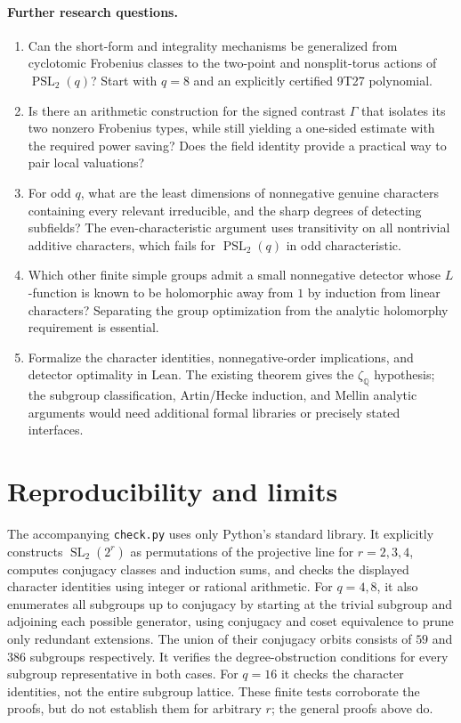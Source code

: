 \documentclass[11pt]{article}
\theoremstyle{remark}\newtheorem{remark}[theorem]{Remark}
\DeclareMathOperator{\PSL}{PSL}\DeclareMathOperator{\SL}{SL}\DeclareMathOperator{\PGL}{PGL}\DeclareMathOperator{\Ind}{Ind}\DeclareMathOperator{\ord}{ord}\DeclareMathOperator{\Gal}{Gal}\DeclareMathOperator{\Tr}{Tr}\DeclareMathOperator{\Rea}{Re}\DeclareMathOperator{\FP}{FP}
\newcommand{\Q}{\mathbb Q}\newcommand{\C}{\mathbb C}\newcommand{\F}{\mathbb F}\newcommand{\one}{\mathbf 1}\newcommand{\St}{\mathrm{St}}\newcommand{\Gg}{\Gamma}\newcommand{\PT}{\mathcal P}\newcommand{\eps}{\varepsilon}
\begin{document}
\paragraph{Further research questions.}
\begin{enumerate}
\item Can the short-form and integrality mechanisms be generalized from cyclotomic Frobenius classes to the two-point and nonsplit-torus actions of $\PSL_2(q)$? Start with $q=8$ and an explicitly certified 9T27 polynomial.
\item Is there an arithmetic construction for the signed contrast $\Gg$ that isolates its two nonzero Frobenius types, while still yielding a one-sided estimate with the required power saving? Does the field identity provide a practical way to pair local valuations?
\item For odd $q$, what are the least dimensions of nonnegative genuine characters containing every relevant irreducible, and the sharp degrees of detecting subfields? The even-characteristic argument uses transitivity on all nontrivial additive characters, which fails for $\PSL_2(q)$ in odd characteristic.
\item Which other finite simple groups admit a small nonnegative detector whose $L$-function is known to be holomorphic away from $1$ by induction from linear characters? Separating the group optimization from the analytic holomorphy requirement is essential.
\item Formalize the character identities, nonnegative-order implications, and detector optimality in Lean. The existing theorem gives the $\zeta_\Q$ hypothesis; the subgroup classification, Artin/Hecke induction, and Mellin analytic arguments would need additional formal libraries or precisely stated interfaces.
\end{enumerate}

\section{Reproducibility and limits}
The accompanying \texttt{check.py} uses only Python's standard library. It explicitly constructs $\SL_2(2^r)$ as permutations of the projective line for $r=2,3,4$, computes conjugacy classes and induction sums, and checks the displayed character identities using integer or rational arithmetic. For $q=4,8$, it also enumerates all subgroups up to conjugacy by starting at the trivial subgroup and adjoining each possible generator, using conjugacy and coset equivalence to prune only redundant extensions. The union of their conjugacy orbits consists of $59$ and $386$ subgroups respectively. It verifies the degree-obstruction conditions for every subgroup representative in both cases. For $q=16$ it checks the character identities, not the entire subgroup lattice. These finite tests corroborate the proofs, but do not establish them for arbitrary $r$; the general proofs above do.
\end{document}
